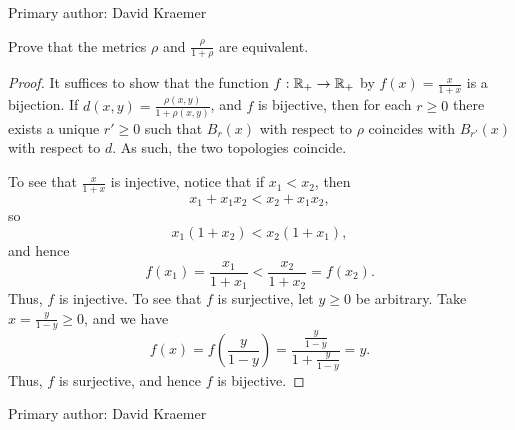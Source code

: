 Primary author: David Kraemer

\begin{minorEx}
    Prove that the metrics $\rho$ and $\frac{\rho}{1 + \rho}$ are equivalent.
\end{minorEx}

\begin{proof}
    It suffices to show that the function $f : \mathbb{R}_{+} \to \mathbb{R}_+$ by
    $f(x) = \frac{x}{1 + x}$ is a bijection. If $d(x,y) =
    \frac{\rho(x, y)}{1 + \rho(x, y)}$, and $f$ is bijective, then for
    each $r \geq 0$ there exists a unique $r' \geq 0$ such that $B_r(x)$
    with respect to $\rho$ coincides with $B_{r'}(x)$ with respect to
    $d$. As such, the two topologies coincide.
    
    To see that $\frac{x}{1 + x}$ is injective, notice that if $x_1 <
    x_2$, then
    \[
        x_1 + x_1 x_2 < x_2 + x_1 x_2,
    \]
    so
    \[
        x_1(1 + x_2) < x_2 (1 + x_1),
    \]
    and hence
    \[
        f(x_1) = \frac{x_1}{1 + x_1} < \frac{x_2}{1 + x_2} = f(x_2).
    \]
    Thus, $f$ is injective. To see that $f$ is surjective, let $y \geq
    0$ be arbitrary. Take $x = \frac{y}{1 - y} \geq 0$, and we have
    \[
        f(x) = f\left( \frac{y}{1 - y} \right) =
        \frac{\frac{y}{1-y}}{1 + \frac{y}{1-y}} = y.
    \]
    Thus, $f$ is surjective, and hence $f$ is bijective.
\end{proof}

Primary author: David Kraemer

